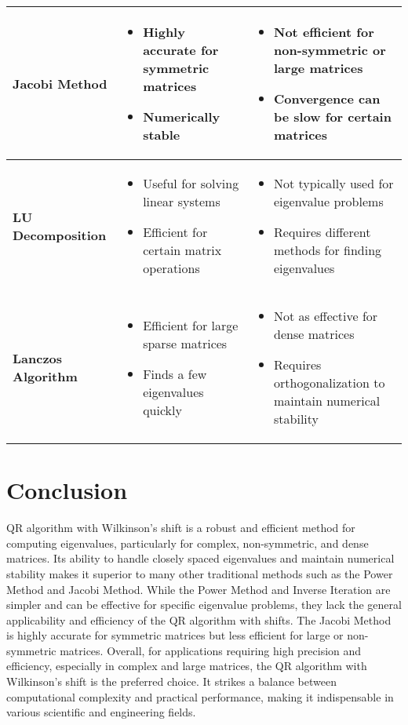 \documentclass[journal]{IEEEtran}
\begin{document}
\begin{tabular}{|p{3cm}|p{4cm}|p{4cm}|}
\hline
\textbf{Jacobi Method} & \begin{itemize}[left=2pt]
    \item Highly accurate for symmetric matrices
    \item Numerically stable
    \end{itemize} & \begin{itemize}[left=2pt]
    \item Not efficient for non-symmetric or large matrices
    \item Convergence can be slow for certain matrices
    \end{itemize} \\
\hline
\textbf{LU Decomposition} & \begin{itemize}[left=2pt]
    \item Useful for solving linear systems
    \item Efficient for certain matrix operations
    \end{itemize} & \begin{itemize}[left=2pt]
    \item Not typically used for eigenvalue problems
    \item Requires different methods for finding eigenvalues
    \end{itemize} \\
\hline
\textbf{Lanczos Algorithm} & \begin{itemize}[left=2pt]
    \item Efficient for large sparse matrices
    \item Finds a few eigenvalues quickly
    \end{itemize} & \begin{itemize}[left=2pt]
    \item Not as effective for dense matrices
    \item Requires orthogonalization to maintain numerical stability
    \end{itemize} \\
\hline
\end{tabular}

\section{Conclusion} 
QR algorithm with Wilkinson's shift is a robust and efficient method for computing eigenvalues, particularly for complex, non-symmetric, and dense matrices. Its ability to handle closely spaced eigenvalues and maintain numerical stability makes it superior to many other traditional methods such as the Power Method and Jacobi Method. While the Power Method and Inverse Iteration are simpler and can be effective for specific eigenvalue problems, they lack the general applicability and efficiency of the QR algorithm with shifts. The Jacobi Method is highly accurate for symmetric matrices but less efficient for large or non-symmetric matrices. Overall, for applications requiring high precision and efficiency, especially in complex and large matrices, the QR algorithm with Wilkinson's shift is the preferred choice. It strikes a balance between computational complexity and practical performance, making it indispensable in various scientific and engineering fields.
\end{document}
